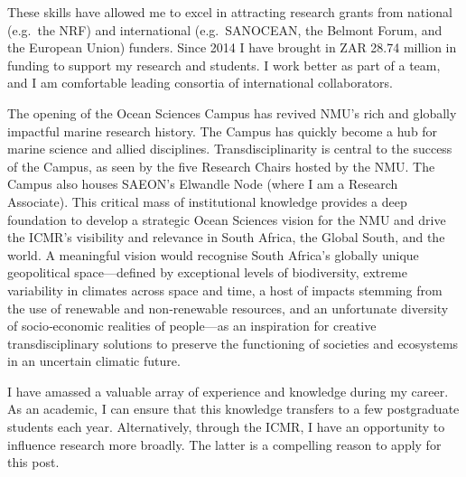 \documentclass[9.5pt, a4paper]{awesome-cv-mod} %
\begin{document}
\begin{cvletter}
These skills have allowed me to excel in attracting research grants from national (e.g.~the NRF) and international (e.g.~SANOCEAN, the Belmont Forum, and the European Union) funders. Since 2014 I have brought in ZAR 28.74 million in funding to support my research and students. I work better as part of a team, and I am comfortable leading consortia of international collaborators. 


The opening of the Ocean Sciences Campus has revived NMU’s rich and globally impactful marine research history. The Campus has quickly become a hub for marine science and allied disciplines. Transdisciplinarity is central to the success of the Campus, as seen by the five Research Chairs hosted by the NMU. The Campus also houses SAEON’s Elwandle Node (where I am a Research Associate). This critical mass of institutional knowledge provides a deep foundation to develop a strategic Ocean Sciences vision for the NMU and drive the ICMR’s visibility and relevance in South Africa, the Global South, and the world. A meaningful vision would recognise South Africa’s globally unique geopolitical space—defined by exceptional levels of biodiversity, extreme variability in climates across space and time, a host of impacts stemming from the use of renewable and non‐renewable resources, and an unfortunate diversity of socio‐economic realities of people—as an inspiration for creative transdisciplinary solutions to preserve the functioning of societies and ecosystems in an uncertain climatic future.

I have amassed a valuable array of experience and knowledge during my career. As an academic, I can ensure that this knowledge transfers to a few postgraduate students each year. Alternatively, through the ICMR, I have an opportunity to influence research more broadly. The latter is a compelling reason to apply for this post.


\end{cvletter}


\makeletterclosing %
\end{document}
